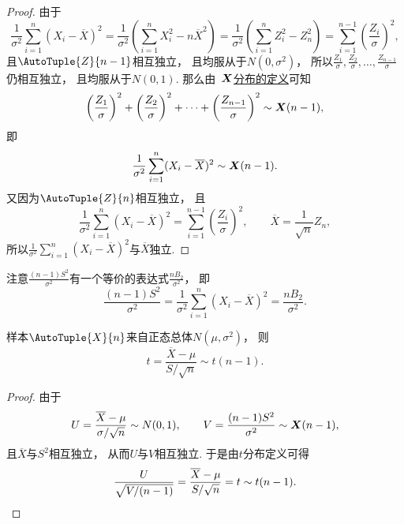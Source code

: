 \begin{theorem}
\begin{proof}
由于\[
	\frac{1}{\sigma^2} \sum_{i=1}^n (X_i-\overline{X})^2
	= \frac{1}{\sigma^2} \left( \sum_{i=1}^n X_i^2 - n \overline{X}^2 \right)
	= \frac{1}{\sigma^2} \left( \sum_{i=1}^n Z_i^2 - Z_n^2 \right)
	= \sum_{i=1}^{n-1} \left( \frac{Z_i}{\sigma} \right)^2,
\]
且\(\AutoTuple{Z}{n-1}\)相互独立，
且均服从于\(N(0,\sigma^2)\)，
所以\(\frac{Z_1}{\sigma},\frac{Z_2}{\sigma},\dotsc,\frac{Z_{n-1}}{\sigma}\)仍相互独立，
且均服从于\(N(0,1)\).
那么由~\hyperref[definition:数理统计的基础知识.卡方分布的定义]{\(\boldsymbol{X}\)分布的定义}可知\[
	\left( \frac{Z_1}{\sigma} \right)^2
	+ \left( \frac{Z_2}{\sigma} \right)^2
	+ \dotsb
	+ \left( \frac{Z_{n-1}}{\sigma} \right)^2
	\sim \boldsymbol{X}(n-1),
\]即\[
	\frac{1}{\sigma^2} \sum_{i=1}^n (X_i-\overline{X})^2 \sim \boldsymbol{X}(n-1).
\]
又因为\(\AutoTuple{Z}{n}\)相互独立，
且\[
	\frac{1}{\sigma^2} \sum_{i=1}^n (X_i-\overline{X})^2
	= \sum_{i=1}^{n-1} \left( \frac{Z_i}{\sigma} \right)^2,
	\qquad
	\overline{X} = \frac{1}{\sqrt{n}} Z_n,
\]
所以\(\frac{1}{\sigma^2} \sum_{i=1}^n (X_i-\overline{X})^2\)与\(\overline{X}\)独立.
\end{proof}
\end{theorem}
注意\(\frac{(n-1) S^2}{\sigma^2}\)有一个等价的表达式\(\frac{n B_2}{\sigma^2}\)，
即\[
	\frac{(n-1) S^2}{\sigma^2}
	= \frac{1}{\sigma^2} \sum_{i=1}^n (X_i - \overline{X})^2
	= \frac{n B_2}{\sigma^2}.
\]

\begin{theorem}
样本\(\AutoTuple{X}{n}\)来自正态总体\(N(\mu,\sigma^2)\)，
则\begin{equation}\label{equation:抽样分布定理.一个正态总体的抽样分布4}
	t = \frac{\overline{X}-\mu}{S / \sqrt{n}} \sim t(n-1).
\end{equation}
\begin{proof}
由于\[
	U = \frac{\overline{X}-\mu}{\sigma/\sqrt{n}} \sim N(0,1),
	\qquad
	V = \frac{(n-1)S^2}{\sigma^2} \sim \boldsymbol{X}(n-1),
\]
且\(\overline{X}\)与\(S^2\)相互独立，
从而\(U\)与\(V\)相互独立.
于是由\(t\)分布定义可得\[
	\frac{U}{\sqrt{V/(n-1)}}
	= \frac{\overline{X}-\mu}{S/\sqrt{n}}
	= t \sim t(n-1).
	\qedhere
\]
\end{proof}
\end{theorem}

